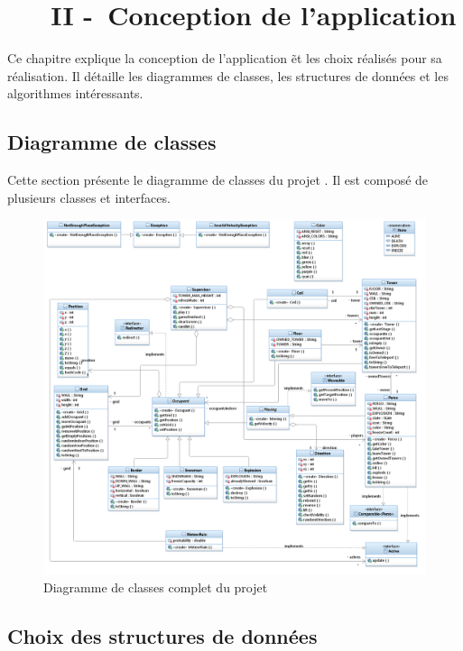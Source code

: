\chapter[~~~CONCEPTION]{~~~II -~Conception de l’application}%
\label{refDev2}%

Ce chapitre explique la conception de l'application \nom\~et les choix réalisés pour sa réalisation. Il détaille les diagrammes de classes, les structures de données et les algorithmes intéressants.

\section{Diagramme de classes}

Cette section présente le diagramme de classes du projet \nom. Il est composé de plusieurs classes et interfaces.

\begin{figure}[!ht] 
  \centering%
  \includegraphics[width=13.9cm]{assets/pictures/ToursInfernales_Main.png}%
  \caption{Diagramme de classes complet du projet}%
\end{figure}
\newpage

\section{Choix des structures de données}

